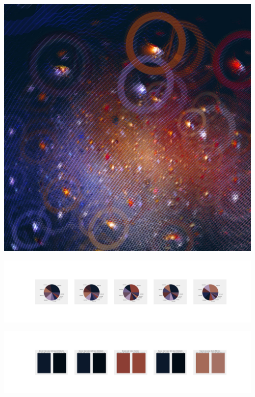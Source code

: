 \documentclass[11pt]{article}
\begin{document}
\begin{landscape}
    \begin{center}
    \includegraphics[width=\textwidth]{./nbimg/file (245).jpg}
    \end{center}

    \begin{center}
    \includegraphics[width=250mm]{./nbimg/pie-162.jpg}
    \end{center}

    \begin{center}
    \includegraphics[width=250mm]{./nbimg/peak-162.jpg}
    \end{center}
    


\end{landscape}
\end{document}
